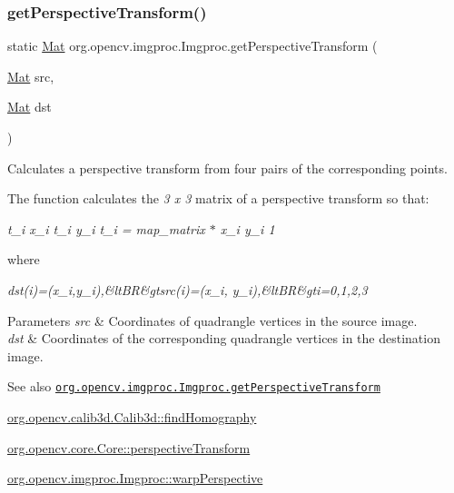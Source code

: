 \subsubsection{\texorpdfstring{get\+Perspective\+Transform()}{getPerspectiveTransform()}}
{\footnotesize\ttfamily static \mbox{\hyperlink{classorg_1_1opencv_1_1core_1_1_mat}{Mat}} org.\+opencv.\+imgproc.\+Imgproc.\+get\+Perspective\+Transform (\begin{DoxyParamCaption}\item[{\mbox{\hyperlink{classorg_1_1opencv_1_1core_1_1_mat}{Mat}}}]{src,  }\item[{\mbox{\hyperlink{classorg_1_1opencv_1_1core_1_1_mat}{Mat}}}]{dst }\end{DoxyParamCaption})\hspace{0.3cm}{\ttfamily [static]}}

Calculates a perspective transform from four pairs of the corresponding points.

The function calculates the {\itshape 3 x 3} matrix of a perspective transform so that\+:

{\itshape t\+\_\+i x\textquotesingle{}\+\_\+i t\+\_\+i y\textquotesingle{}\+\_\+i t\+\_\+i = map\+\_\+matrix $\ast$ x\+\_\+i y\+\_\+i 1 }

where

{\itshape dst(i)=(x\textquotesingle{}\+\_\+i,y\textquotesingle{}\+\_\+i),\&lt\+BR\&gtsrc(i)=(x\+\_\+i, y\+\_\+i),\&lt\+BR\&gti=0,1,2,3}


\begin{DoxyParams}{Parameters}
{\em src} & Coordinates of quadrangle vertices in the source image. \\
\hline
{\em dst} & Coordinates of the corresponding quadrangle vertices in the destination image.\\
\hline
\end{DoxyParams}
\begin{DoxySeeAlso}{See also}
\href{http://docs.opencv.org/modules/imgproc/doc/geometric_transformations.html#getperspectivetransform}{\tt org.\+opencv.\+imgproc.\+Imgproc.\+get\+Perspective\+Transform} 

\mbox{\hyperlink{classorg_1_1opencv_1_1calib3d_1_1_calib3d_a2c32d44d2f35dc41aa09d54eb6829ab8}{org.\+opencv.\+calib3d.\+Calib3d\+::find\+Homography}} 

\mbox{\hyperlink{classorg_1_1opencv_1_1core_1_1_core_a1ff0eace0f00e79af5228fdae120342a}{org.\+opencv.\+core.\+Core\+::perspective\+Transform}} 

\mbox{\hyperlink{classorg_1_1opencv_1_1imgproc_1_1_imgproc_aad167fa9fe0009a54f7732488102938c}{org.\+opencv.\+imgproc.\+Imgproc\+::warp\+Perspective}} 
\end{DoxySeeAlso}
\mbox{\label{classorg_1_1opencv_1_1imgproc_1_1_imgproc_aa547e4fbdf1a4806a1fd35ebbfe2a117}} 
